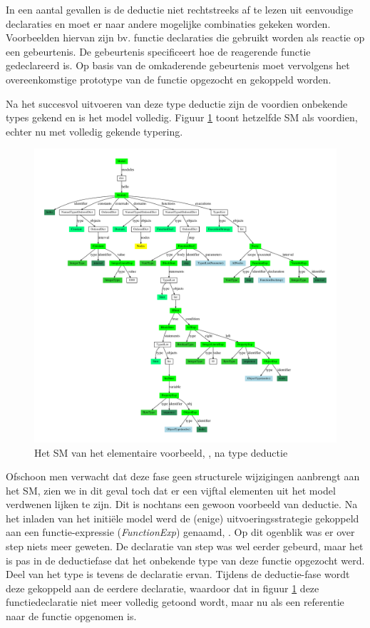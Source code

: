 In een aantal gevallen is de deductie niet rechtstreeks af te lezen uit
eenvoudige declaraties en moet er naar andere mogelijke combinaties gekeken
worden. Voorbeelden hiervan zijn bv. functie declaraties die gebruikt worden
als reactie op een gebeurtenis. De gebeurtenis specificeert hoe de reagerende
functie gedeclareerd is. Op basis van de omkaderende gebeurtenis moet
vervolgens het overeenkomstige prototype van de functie opgezocht en gekoppeld
worden.

Na het succesvol uitvoeren van deze type deductie zijn de voordien onbekende
types gekend en is het model volledig. Figuur \ref{fig:hello.sm-inferred} toont
hetzelfde SM als voordien, echter nu met volledig gekende typering.

\begin{figure}[ht]
  \centering
  \includegraphics[width=\linewidth]{resources/hello_sm_inferred.pdf}
  \caption{Het SM van het elementaire voorbeeld, , na type deductie}
  \label{fig:hello.sm-inferred}
\end{figure}

Ofschoon men verwacht dat deze fase geen structurele wijzigingen aanbrengt aan
het SM, zien we in dit geval toch dat er een vijftal elementen uit het model
verdwenen lijken te zijn. Dit is nochtans een gewoon voorbeeld van deductie. Na
het inladen van het initi\"ele model werd de (enige) uitvoeringsstrategie
gekoppeld aan een functie-expressie (\emph{FunctionExp}) genaamd, .
Op dit ogenblik was er over step niets meer geweten. De declaratie van step was
wel eerder gebeurd, maar het is pas in de deductiefase dat het onbekende type
van deze functie opgezocht werd. Deel van het type is tevens de declaratie
ervan. Tijdens de deductie-fase wordt deze gekoppeld aan de eerdere declaratie,
waardoor dat in figuur \ref{fig:hello.sm-inferred} deze functiedeclaratie niet
meer volledig getoond wordt, maar nu als een referentie naar de 
functie opgenomen is.

